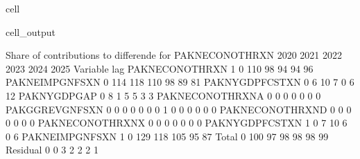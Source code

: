 \documentclass[letterpaper,10pt,english]{jupyterBook}
\begin{document}
\begin{sphinxuseclass}{cell}
\begin{sphinxVerbatimOutput}
\begin{sphinxuseclass}{cell_output}
\begin{sphinxVerbatim}[commandchars=\\\{\}]
 Share of contributions to differende for  PAKNECONOTHRXN
                            2020        2021        2022        2023        2024        2025
Variable         lag                                                                        
PAKNECONOTHRXN   \PYGZhy{}1           0\PYGZpc{}        110\PYGZpc{}         98\PYGZpc{}         94\PYGZpc{}         94\PYGZpc{}         96\PYGZpc{}
PAKNEIMPGNFSXN    0         114\PYGZpc{}        118\PYGZpc{}        110\PYGZpc{}         98\PYGZpc{}         89\PYGZpc{}         81\PYGZpc{}
PAKNYGDPFCSTXN    0          \PYGZhy{}6\PYGZpc{}        \PYGZhy{}10\PYGZpc{}         \PYGZhy{}7\PYGZpc{}          0\PYGZpc{}          6\PYGZpc{}         12\PYGZpc{}
PAKNYGDPGAP\PYGZus{}      0          \PYGZhy{}8\PYGZpc{}          1\PYGZpc{}          5\PYGZpc{}          5\PYGZpc{}          3\PYGZpc{}          3\PYGZpc{}
PAKNECONOTHRXN\PYGZus{}A  0           0\PYGZpc{}          0\PYGZpc{}          0\PYGZpc{}          0\PYGZpc{}          0\PYGZpc{}          0\PYGZpc{}
PAKGGREVGNFSXN    0           0\PYGZpc{}          0\PYGZpc{}          0\PYGZpc{}          0\PYGZpc{}          0\PYGZpc{}          0\PYGZpc{}
                 \PYGZhy{}1           0\PYGZpc{}          0\PYGZpc{}          0\PYGZpc{}          0\PYGZpc{}          0\PYGZpc{}          0\PYGZpc{}
PAKNECONOTHRXN\PYGZus{}D  0           0\PYGZpc{}          0\PYGZpc{}          0\PYGZpc{}          0\PYGZpc{}          0\PYGZpc{}          0\PYGZpc{}
PAKNECONOTHRXN\PYGZus{}X  0           0\PYGZpc{}          0\PYGZpc{}          0\PYGZpc{}          0\PYGZpc{}          0\PYGZpc{}          0\PYGZpc{}
PAKNYGDPFCSTXN   \PYGZhy{}1           0\PYGZpc{}          7\PYGZpc{}         10\PYGZpc{}          6\PYGZpc{}         \PYGZhy{}0\PYGZpc{}         \PYGZhy{}6\PYGZpc{}
PAKNEIMPGNFSXN   \PYGZhy{}1           0\PYGZpc{}       \PYGZhy{}129\PYGZpc{}       \PYGZhy{}118\PYGZpc{}       \PYGZhy{}105\PYGZpc{}        \PYGZhy{}95\PYGZpc{}        \PYGZhy{}87\PYGZpc{}
Total             0         100\PYGZpc{}         97\PYGZpc{}         98\PYGZpc{}         98\PYGZpc{}         98\PYGZpc{}         99\PYGZpc{}
Residual          0          \PYGZhy{}0\PYGZpc{}         \PYGZhy{}3\PYGZpc{}         \PYGZhy{}2\PYGZpc{}         \PYGZhy{}2\PYGZpc{}         \PYGZhy{}2\PYGZpc{}         \PYGZhy{}1\PYGZpc{}


\end{sphinxVerbatim}
\end{sphinxuseclass}
\end{sphinxVerbatimOutput}
\end{sphinxuseclass}
\end{document}
